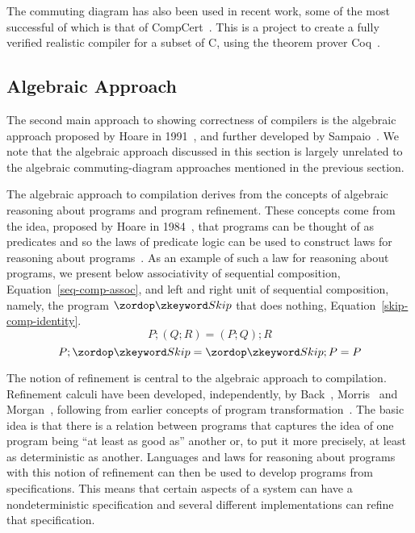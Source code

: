 \documentclass[a4paper,10pt]{report}
\begin{document}
The commuting diagram has also been used in recent work, some of the
most successful of which is that of CompCert~\cite{leroy2009a,
  leroy2009b, leroy2012}.
This is a project to create a fully verified realistic compiler for a
subset of C, using the theorem prover Coq~\cite{coq2004}.

\subsection{Algebraic Approach}
\label{algebraic-approach-subsection}

The second main approach to showing correctness of compilers is the
algebraic approach proposed by Hoare in 1991~\cite{hoare1991}, and
further developed by Sampaio~\cite{hoare1993, sampaio1993,
  sampaio1997}.
We note that the algebraic approach discussed in this section is
largely unrelated to the algebraic commuting-diagram approaches
mentioned in the previous section.

The algebraic approach to compilation derives from the concepts of
algebraic reasoning about programs and program refinement.
These concepts come from the idea, proposed by Hoare in
1984~\cite{hoare1984}, that programs can be thought of as predicates
and so the laws of predicate logic can be used to construct laws for
reasoning about programs~\cite{hoare1987}.
As an example of such a law for reasoning about programs, we present
below associativity of sequential composition,
Equation~\eqref{seq-comp-assoc}, and left and right unit of sequential
composition, namely, the program $\Skip$ that does nothing,
Equation~\eqref{skip-comp-identity}.
\begin{equation}
  \label{seq-comp-assoc}
  P;(Q;R) = (P;Q);R
\end{equation}
\begin{equation}
  \label{skip-comp-identity}
  P;\Skip = \Skip;P = P
\end{equation}

The notion of refinement is central to the algebraic approach to
compilation.
Refinement calculi have been developed, independently, by
Back~\cite{back1981}, Morris~\cite{morris1987} and
Morgan~\cite{morgan1990}, following from earlier concepts of program
transformation~\cite{bauer1976, balzer1976, standish1976, arsac1979}.
The basic idea is that there is a relation between programs that
captures the idea of one program being ``at least as good as'' another
or, to put it more precisely, at least as deterministic as another.
Languages and laws for reasoning about programs with this notion of
refinement can then be used to develop programs from specifications.
This means that certain aspects of a system can have a
nondeterministic specification and several different implementations
can refine that specification.
\end{document}

